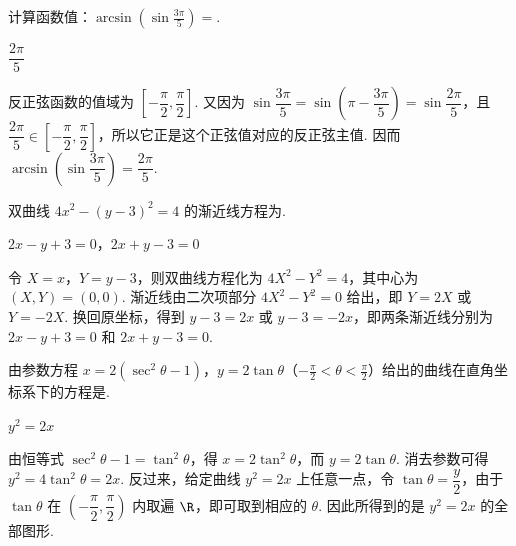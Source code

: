 \documentclass[UTF8,a4paper,oneside,11pt]{ctexbook}
\begin{document}
\begin{problem}
计算函数值：\(\arcsin\left(\sin\frac{3\pi}{5}\right)=\)\fillinblank{}.
\end{problem}

\begin{answer}
\(\dfrac{2\pi}{5}\)
\end{answer}

\begin{solution}
反正弦函数的值域为 \(\left[-\dfrac{\pi}{2},\dfrac{\pi}{2}\right]\). 又因为
\(\sin\dfrac{3\pi}{5}=\sin\left(\pi-\dfrac{3\pi}{5}\right)=\sin\dfrac{2\pi}{5}\)，且 \(\dfrac{2\pi}{5}\in\left[-\dfrac{\pi}{2},\dfrac{\pi}{2}\right]\)，所以它正是这个正弦值对应的反正弦主值. 因而 \(\arcsin\left(\sin\dfrac{3\pi}{5}\right)=\dfrac{2\pi}{5}\).
\end{solution}

\begin{problem}
双曲线 \(4x^2-\left(y-3\right)^2=4\) 的渐近线方程为\fillinblank{}.
\end{problem}

\begin{answer}
\(2x-y+3=0\)，\(2x+y-3=0\)
\end{answer}

\begin{solution}
令 \(X=x\)，\(Y=y-3\)，则双曲线方程化为 \(4X^2-Y^2=4\)，其中心为 \((X,Y)=(0,0)\). 渐近线由二次项部分 \(4X^2-Y^2=0\) 给出，即 \(Y=2X\) 或 \(Y=-2X\). 换回原坐标，得到 \(y-3=2x\) 或 \(y-3=-2x\)，即两条渐近线分别为 \(2x-y+3=0\) 和 \(2x+y-3=0\).
\end{solution}

\begin{problem}
由参数方程 \(x=2\left(\sec^2\theta-1\right)\)，\(y=2\tan\theta\)（\(-\frac{\pi}{2}<\theta<\frac{\pi}{2}\)）给出的曲线在直角坐标系下的方程是\fillinblank{}.
\end{problem}

\begin{answer}
\(y^2=2x\)
\end{answer}

\begin{solution}
由恒等式 \(\sec^2\theta-1=\tan^2\theta\)，得 \(x=2\tan^2\theta\)，而 \(y=2\tan\theta\). 消去参数可得 \(y^2=4\tan^2\theta=2x\). 反过来，给定曲线 \(y^2=2x\) 上任意一点，令 \(\tan\theta=\dfrac{y}{2}\)，由于 \(\tan\theta\) 在 \(\left(-\dfrac{\pi}{2},\dfrac{\pi}{2}\right)\) 内取遍 \(\R\)，即可取到相应的 \(\theta\). 因此所得到的是 \(y^2=2x\) 的全部图形.
\end{solution}
\end{document}
